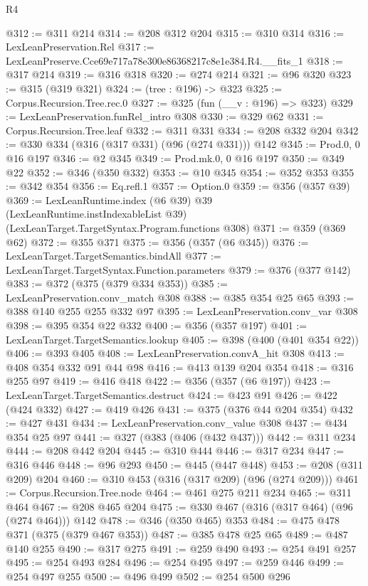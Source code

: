 \begin{lexlean}{R4}
\begin{coremodule}
@312 := @311 @214
@314 := @208 @312 @204
@315 := @310 @314
@316 := LexLeanPreservation.Rel
@317 := LexLeanPreserve.Cce69e717a78e300e86368217c8e1e384.R4.__fits_1
@318 := @317 @214
@319 := @316 @318
@320 := @274 @214
@321 := @96 @320
@323 := @315 (@319 @321)
@324 := (tree : @196) -> @323
@325 := Corpus.Recursion.Tree.rec.{0}
@327 := @325 (fun (__v : @196) => @323)
@329 := LexLeanPreservation.funRel_intro @308
@330 := @329 @62
@331 := Corpus.Recursion.Tree.leaf
@332 := @311 @331
@334 := @208 @332 @204
@342 := @330 @334 (@316 (@317 @331) (@96 (@274 @331))) @142
@345 := Prod.{0, 0} @16 @197
@346 := @2 @345
@349 := Prod.mk.{0, 0} @16 @197
@350 := @349 @22
@352 := @346 (@350 @332)
@353 := @10 @345
@354 := @352 @353
@355 := @342 @354
@356 := Eq.refl.{1}
@357 := Option.{0}
@359 := @356 (@357 @39)
@369 := LexLeanRuntime.index
    (@6 @39)
    @39
    (LexLeanRuntime.instIndexableList @39)
    (LexLeanTarget.TargetSyntax.Program.functions @308)
@371 := @359 (@369 @62)
@372 := @355 @371
@375 := @356 (@357 (@6 @345))
@376 := LexLeanTarget.TargetSemantics.bindAll
@377 := LexLeanTarget.TargetSyntax.Function.parameters
@379 := @376 (@377 @142)
@383 := @372 (@375 (@379 @334 @353))
@385 := LexLeanPreservation.conv_match @308
@388 := @385 @354 @25 @65
@393 := @388 @140 @255 @255 @332 @97
@395 := LexLeanPreservation.conv_var @308
@398 := @395 @354 @22 @332
@400 := @356 (@357 @197)
@401 := LexLeanTarget.TargetSemantics.lookup
@405 := @398 (@400 (@401 @354 @22))
@406 := @393 @405
@408 := LexLeanPreservation.convA_hit @308
@413 := @408 @354 @332 @91 @44 @98
@416 := @413 @139 @204 @354
@418 := @316 @255 @97
@419 := @416 @418
@422 := @356 (@357 (@6 @197))
@423 := LexLeanTarget.TargetSemantics.destruct
@424 := @423 @91
@426 := @422 (@424 @332)
@427 := @419 @426
@431 := @375 (@376 @44 @204 @354)
@432 := @427 @431
@434 := LexLeanPreservation.conv_value @308
@437 := @434 @354 @25 @97
@441 := @327 (@383 (@406 (@432 @437)))
@442 := @311 @234
@444 := @208 @442 @204
@445 := @310 @444
@446 := @317 @234
@447 := @316 @446
@448 := @96 @293
@450 := @445 (@447 @448)
@453 := @208 (@311 @209) @204
@460 := @310 @453 (@316 (@317 @209) (@96 (@274 @209)))
@461 := Corpus.Recursion.Tree.node
@464 := @461 @275 @211 @234
@465 := @311 @464
@467 := @208 @465 @204
@475 := @330 @467 (@316 (@317 @464) (@96 (@274 @464))) @142
@478 := @346 (@350 @465) @353
@484 := @475 @478 @371 (@375 (@379 @467 @353))
@487 := @385 @478 @25 @65
@489 := @487 @140 @255
@490 := @317 @275
@491 := @259 @490
@493 := @254 @491 @257
@495 := @254 @493 @284
@496 := @254 @495
@497 := @259 @446
@499 := @254 @497 @255
@500 := @496 @499
@502 := @254 @500 @296

\end{coremodule}
\end{lexlean}
